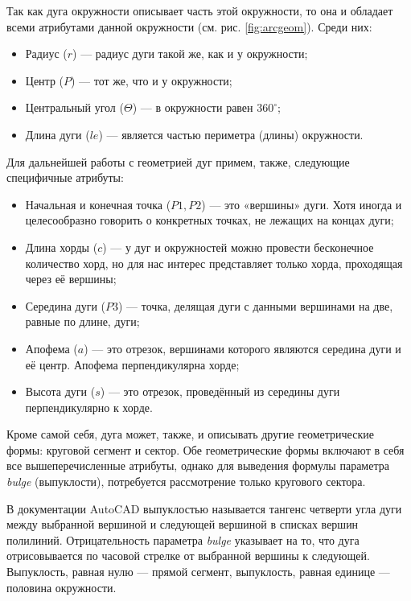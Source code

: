 Так как дуга окружности описывает часть этой окружности, то она и обладает всеми атрибутами данной окружности (см. рис. \ref{fig:arcgeom}). Среди них:

\begin{itemize}
	\item Радиус ($r$) --- радиус дуги такой же, как и у окружности;
	\item Центр ($P$) --- тот же, что и у окружности;
	\item Центральный угол ($\Theta$) --- в окружности равен $360^{\circ}$;
	\item Длина дуги ($le$) --- является частью периметра (длины) окружности.
\end{itemize}

Для дальнейшей работы с геометрией дуг примем, также, следующие специфичные атрибуты:

\begin{itemize}
	\item Начальная и конечная точка ($P1, P2$) --- это «вершины» дуги. Хотя иногда и целесообразно говорить о конкретных точках, не лежащих на концах дуги;
	\item Длина хорды ($c$) --- у дуг и окружностей можно провести бесконечное количество хорд, но для нас интерес представляет только хорда, проходящая через её вершины;
	\item Середина дуги ($P3$) --- точка, делящая дуги с данными вершинами на две, равные по длине, дуги;
	\item Апофема ($a$) --- это отрезок, вершинами которого являются середина дуги и её центр. Апофема перпендикулярна хорде;
	\item Высота дуги ($s$) --- это отрезок, проведённый из середины дуги перпендикулярно к хорде.
\end{itemize}

 Кроме самой себя, дуга может, также, и описывать другие геометрические формы: круговой сегмент и сектор. Обе геометрические формы включают в себя все вышеперечисленные атрибуты, однако для выведения формулы параметра \textit{bulge} (выпуклости), потребуется рассмотрение только кругового сектора.

В документации AutoCAD \cite{Autodesk} выпуклостью называется тангенс четверти угла дуги между выбранной вершиной и следующей вершиной в списках вершин полилиний. Отрицательность параметра \textit{bulge} указывает на то, что дуга отрисовывается по часовой стрелке от выбранной вершины к следующей. Выпуклость, равная нулю --- прямой сегмент, выпуклость, равная единице --- половина окружности.

